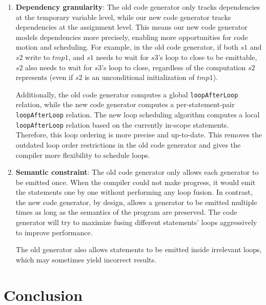 \documentclass[sigplan, nonacm]{acmart}\settopmatter{printfolios=true,printccs=false,printacmref=false}
\begin{document}
\begin{enumerate}
\item \textbf{Dependency granularity}: The old code generator only tracks dependencies at the temporary variable level, while our new code generator tracks dependencies at the assignment level. This means our new code generator models dependencies more precisely, enabling more opportunities for code motion and scheduling. For example, in the old code generator, if both $s1$ and $s2$ write to $tmp1$, and $s1$ needs to wait for $s3$'s loop to close to be emittable, $s2$ also needs to wait for $s3$'s loop to close, regardless of the computation $s2$ represents (even if $s2$ is an unconditional initialization of $tmp1$).

Additionally, the old code generator computes a global \texttt{loopAfterLoop} relation, while the new code generator computes a per-statement-pair \texttt{loopAfterLoop} relation. The new loop scheduling algorithm computes a local \texttt{loopAfterLoop} relation based on the currently in-scope statements. Therefore, this loop ordering is more precise and up-to-date. This removes the outdated loop order restrictions in the old code generator and gives the compiler more flexibility to schedule loops.

\item \textbf{Semantic constraint}: The old code generator only allows each generator to be emitted once. When the compiler could not make progress, it would emit the statements one by one without performing any loop fusion. In contrast, the new code generator, by design, allows a generator to be emitted multiple times as long as the semantics of the program are preserved. The code generator will try to maximize fusing different statements' loops aggressively to improve performance.

The old generator also allows statements to be emitted inside irrelevant loops, which may sometimes yield incorrect results.
\end{enumerate}



\section{Conclusion}\label{conclusion}


\end{document}
